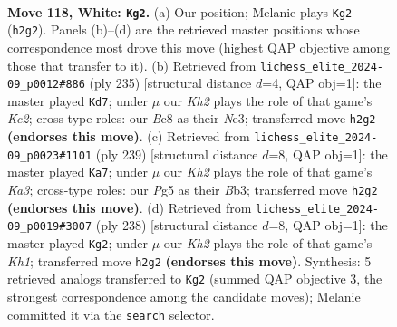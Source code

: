 \documentclass[11pt]{article}
\begin{document}
\clearpage

\begin{figure}[p]\centering
\begin{subfigure}{0.46\textwidth}\centering
\resizebox{\linewidth}{!}{%
\newchessgame
\chessboard[
  setfen={2B5/6k1/8/6PP/8/8/3n3K/8 w - - 5 118},
  showmover=false,
  pgfstyle=straightmove, color=movearrow, markmove={h2-g2}
]}
\caption{}
\end{subfigure}\hfill
\begin{subfigure}{0.46\textwidth}\centering
\resizebox{\linewidth}{!}{%
\newchessgame
\chessboard[
  setfen={8/2k1N3/8/2p5/p7/2K1n3/8/8 b - - 13 118},
  showmover=false,
  pgfstyle=straightmove, color=movearrow, markmove={c7-d7}
]}
\caption{}
\end{subfigure}
\\[4pt]
\begin{subfigure}{0.46\textwidth}\centering
\resizebox{\linewidth}{!}{%
\newchessgame
\chessboard[
  setfen={8/8/k7/8/8/pb6/8/1K6 b - - 89 120},
  showmover=false,
  pgfstyle=straightmove, color=movearrow, markmove={a6-a7}
]}
\caption{}
\end{subfigure}\hfill
\begin{subfigure}{0.46\textwidth}\centering
\resizebox{\linewidth}{!}{%
\newchessgame
\chessboard[
  setfen={8/5k2/8/5P2/4n3/8/8/7K w - - 81 120},
  showmover=false,
  pgfstyle=straightmove, color=movearrow, markmove={h1-g2}
]}
\caption{}
\end{subfigure}
\caption{\textbf{Move 118, White: \texttt{Kg2}.} (a) Our position; Melanie plays \texttt{Kg2} (\texttt{h2g2}). Panels (b)--(d) are the retrieved master positions whose correspondence most drove this move (highest QAP objective among those that transfer to it). (b) Retrieved from \texttt{lichess\_elite\_2024-09\_p0012\#886} (ply 235) [structural distance $d$=4, QAP obj=1]: the master played \texttt{Kd7}; under $\mu$ our \emph{Kh2} plays the role of that game's \emph{Kc2}; cross-type roles: our \emph{B}c8 as their \emph{N}e3; transferred move \texttt{h2g2} \textbf{(endorses this move)}. (c) Retrieved from \texttt{lichess\_elite\_2024-09\_p0023\#1101} (ply 239) [structural distance $d$=8, QAP obj=1]: the master played \texttt{Ka7}; under $\mu$ our \emph{Kh2} plays the role of that game's \emph{Ka3}; cross-type roles: our \emph{P}g5 as their \emph{B}b3; transferred move \texttt{h2g2} \textbf{(endorses this move)}. (d) Retrieved from \texttt{lichess\_elite\_2024-09\_p0019\#3007} (ply 238) [structural distance $d$=8, QAP obj=1]: the master played \texttt{Kg2}; under $\mu$ our \emph{Kh2} plays the role of that game's \emph{Kh1}; transferred move \texttt{h2g2} \textbf{(endorses this move)}. Synthesis: 5 retrieved analogs transferred to \texttt{Kg2} (summed QAP objective 3, the strongest correspondence among the candidate moves); Melanie committed it via the \texttt{search} selector.}
\label{fig:thought-m234}
\end{figure}
\end{document}
